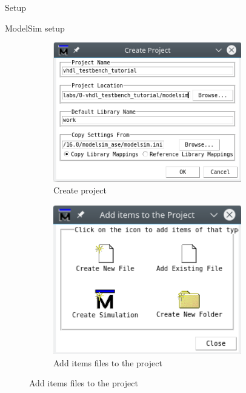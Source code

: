 \documentclass[a4paper, 12pt, onecolumn]{article}
\begin{document}
\begin{section}{Setup}
\begin{subsection}{ModelSim setup}
\begin{enumerate}
                \begin{figure}[!h]
                    \centering
                    \begin{subfigure}[t]{0.45\textwidth}
                        \centering
                        \includegraphics[width=0.9\textwidth]{figs/create_project.png}
                        \caption{Create project}
                        \label{fig:create_project}
                    \end{subfigure}
                    \hspace{1em}
                    \begin{subfigure}[t]{0.40\textwidth}
                        \centering
                        \includegraphics[width=0.9\textwidth]{figs/add_files_to_project.png}
                        \caption{Add items files to the project}
                        \label{fig:add_files_to_project}

\end{subfigure}
\end{figure}
\end{enumerate}
\end{subsection}
\end{section}
\end{document}
